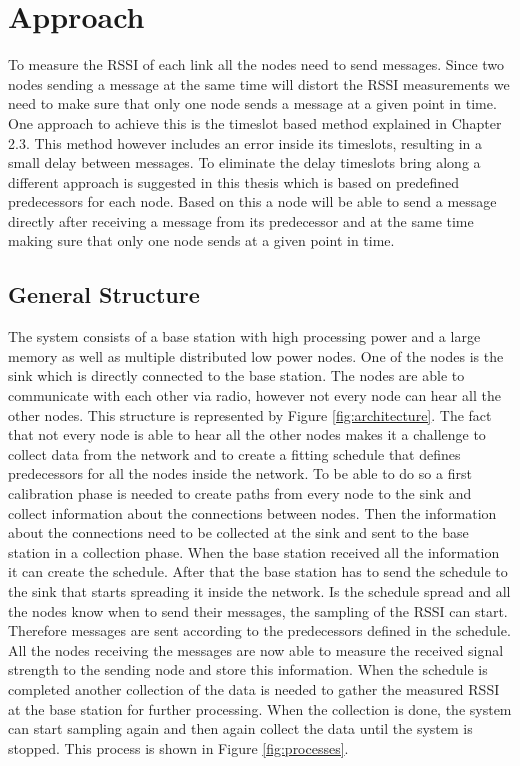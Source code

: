 \chapter{Approach}
To measure the RSSI of each link all the nodes need to send messages. Since two nodes sending a message at the same time will distort the RSSI measurements we need to make sure that only one node sends a message at a given point in time. One approach to achieve this is the timeslot based method explained in Chapter 2.3. This method however includes an error inside its timeslots, resulting in a small delay between messages.
To eliminate the delay timeslots bring along a different approach is suggested in this thesis which is based on predefined predecessors for each node. Based on this a node will be able to send a message directly after receiving a message from its predecessor and at the same time making sure that only one node sends at a given point in time.

\section{General Structure}

The system consists of a base station with high processing power and a large memory as well as multiple distributed low power nodes. One of the nodes is the sink which is directly connected to the base station. The nodes are able to communicate with each other via radio, however not every node can hear all the other nodes. This structure is represented by Figure \ref{fig:architecture}. The fact that not every node is able to hear all the other nodes makes it a challenge to collect data from the network and to create a fitting schedule that defines predecessors for all the nodes inside the network. To be able to do so a first calibration phase is needed to create paths from every node to the sink and collect information about the connections between nodes. Then the information about the connections need to be collected at the sink and sent to the base station in a collection phase. When the base station received all the information it can create the schedule. After that the base station has to send the schedule to the sink that starts spreading it inside the network. Is the schedule spread and all the nodes know when to send their messages, the sampling of the RSSI can start. Therefore messages are sent according to the predecessors defined in the schedule. All the nodes receiving the messages are now able to measure the received signal strength to the sending node and store this information. When the schedule is completed another collection of the data is needed to gather the measured RSSI at the base station for further processing. When the collection is done, the system can start sampling again and then again collect the data until the system is stopped. This process is shown in Figure \ref{fig:processes}.    

